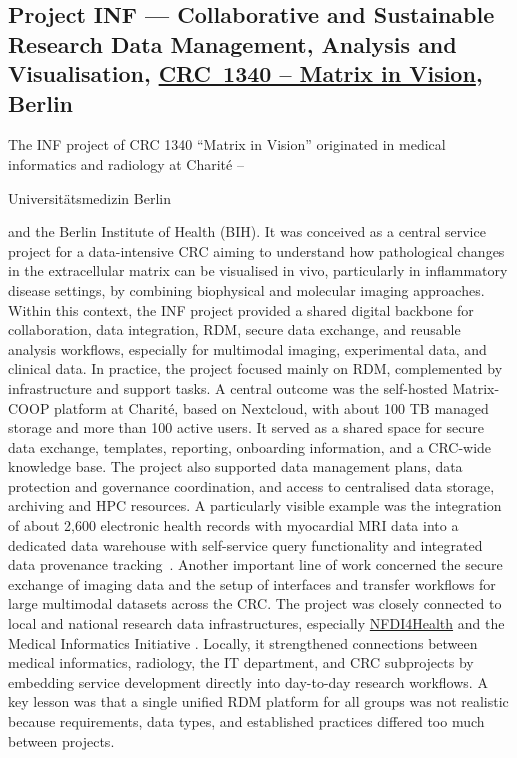 \documentclass{eceasst}
\newenvironment{de}{\begin{otherlanguage}{ngerman}}{\end{otherlanguage}}
\begin{document}
\subsection{Project INF --- Collaborative and Sustainable Research Data Management, Analysis and Visualisation, \href{https://gepris.dfg.de/gepris/projekt/372486779}{CRC~1340 -- Matrix in Vision}, Berlin} \label{sec:sfb1340}
The INF project of CRC 1340 “Matrix in Vision” originated in medical informatics and radiology at Charité – \begin{de}Universitätsmedizin Berlin\end{de} and the Berlin Institute of Health (BIH).
It was conceived as a central service project for a data-intensive CRC aiming to understand how pathological changes in the extracellular matrix can be visualised in vivo, particularly in inflammatory disease settings, by combining biophysical and molecular imaging approaches.
Within this context, the INF project provided a shared digital backbone for collaboration, data integration, RDM, secure data exchange, and reusable analysis workflows, especially for multimodal imaging, experimental data, and clinical data.
In practice, the project focused mainly on RDM, complemented by infrastructure and support tasks.
A central outcome was the self-hosted Matrix-COOP platform at Charité, based on Nextcloud, with about 100 TB managed storage and more than 100 active users.
It served as a shared space for secure data exchange, templates, reporting, onboarding information, and a CRC-wide knowledge base.
The project also supported data management plans, data protection and governance coordination, and access to centralised data storage, archiving and HPC resources.
A particularly visible example was the integration of about 2,600 electronic health records with myocardial MRI data into a dedicated data warehouse with self-service query functionality and integrated data provenance tracking~\cite{johns_prov_tracking_2025}.
Another important line of work concerned the secure exchange of imaging data and the setup of interfaces and transfer workflows for large multimodal datasets across the CRC. The project was closely connected to local and national research data infrastructures, especially \href{https://www.nfdi4health.de/}{NFDI4Health} \cite{fluck_bausteine_2021} and the Medical Informatics Initiative \cite{prasser_difuture_2018}.
Locally, it strengthened connections between medical informatics, radiology, the IT department, and CRC subprojects by embedding service development directly into day-to-day research workflows. A key lesson was that a single unified RDM platform for all groups was not realistic because requirements, data types, and established practices differed too much between projects.
\end{document}
